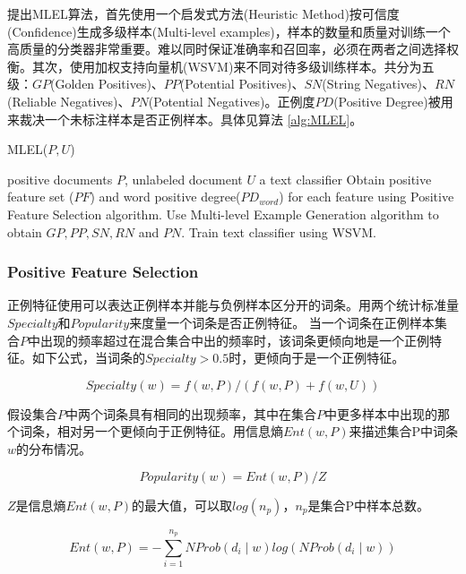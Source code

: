 
\citet{AAAI113583}提出MLEL算法\cite{AAAI113583}，首先使用一个启发式方法(Heuristic Method)按可信度(Confidence)生成多级样本(Multi-level examples)，样本的数量和质量对训练一个高质量的分类器非常重要。难以同时保证准确率和召回率，必须在两者之间选择权衡。其次，使用加权支持向量机(WSVM)来不同对待多级训练样本。共分为五级：$GP$(Golden Positives)、$PP$(Potential Positives)、$SN$(String Negatives)、$RN$(Reliable Negatives)、$PN$(Potential
Negatives)。正例度$PD$(Positive Degree)被用来裁决一个未标注样本是否正例样本。具体见算法 \ref{alg:MLEL}。

\begin{algorithm}[htb]
\caption{MLEL($P,U$)}
\label{alg:MLEL}
\begin{algorithmic}[1]
\REQUIRE positive documents $P$, unlabeled document $U$
\ENSURE a text classifier
\STATE Obtain positive feature set ($PF$) and word positive
\STATE degree($PD_{word}$) for each feature using Positive Feature
\STATE Selection algorithm.
\STATE Use Multi-level Example Generation algorithm to
\STATE obtain $GP, PP, SN, RN$ and $PN$.
\STATE Train text classifier using WSVM.
\RETURN 
\end{algorithmic}
\end{algorithm}

\subsubsection{Positive Feature Selection}
正例特征使用可以表达正例样本并能与负例样本区分开的词条。用两个统计标准量$Specialty$和$Popularity$来度量一个词条是否正例特征。
当一个词条在正例样本集合$P$中出现的频率超过在混合集合中出的频率时，该词条更倾向地是一个正例特征。如下公式，当词条的$Specialty > 0.5$时，更倾向于是一个正例特征。

\begin{equation}
Specialty(w) = f(w,P)/(f(w,P) + f(w,U))
\end{equation}

假设集合$P$中两个词条具有相同的出现频率，其中在集合$P$中更多样本中出现的那个词条，相对另一个更倾向于正例特征。用信息熵$Ent(w,P)$来描述集合P中词条$w$的分布情况。

\begin{equation}
Popularity(w) = Ent(w,P) / Z
\end{equation}

$Z$是信息熵$Ent(w,P)$的最大值，可以取$log(n_p)$，$n_p$是集合P中样本总数。

\begin{equation}
Ent(w,P) = -\sum\limits_{i=1}^{n_p}NProb(d_i \mid w)log(NProb(d_i \mid w))
\end{equation}

